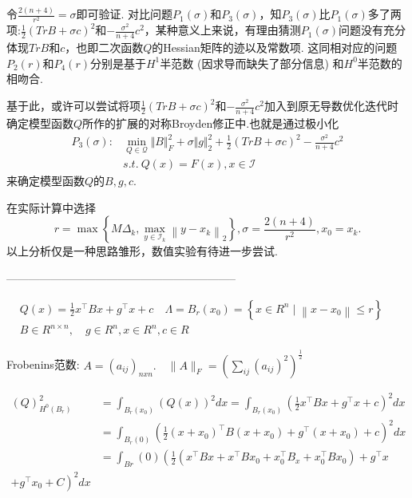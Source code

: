 \documentclass[UTF8]{ctexart}
\begin{document}
%
令$\frac{2(n+4)}{r^2}=\sigma$即可验证. 对比问题$P_1(\sigma)$和$P_3(\sigma)$，知$P_3(\sigma)$比$P_1(\sigma)$多了两项:$\frac{1}{2}(TrB+\sigma c)^{2}$和$-\frac{\sigma^2}{n+4}c^2$，某种意义上来说，有理由猜测$P_1(\sigma)$问题没有充分体现$TrB$和$c$，也即二次函数$Q$的Hessian矩阵的迹以及常数项. 这同相对应的问题$P_2(r)$和$P_4(r)$分别是基于$H^1$半范数 (因求导而缺失了部分信息) 和$H^0$半范数的相吻合.

基于此，或许可以尝试将项$\frac{1}{2}(TrB+\sigma c)^{2}$和$-\frac{\sigma^2}{n+4}c^2$加入到原无导数优化迭代时确定模型函数$Q$所作的扩展的对称Broyden修正中.也就是通过极小化
\begin{align*}
P_{3}(\sigma):&\mathop{\min}\limits_{Q\in\mathcal{Q}}\Vert B\Vert^{2}_{F}+\sigma\Vert g\Vert^{2}_{2}+\frac{1}{2}(TrB+\sigma c)^{2}-\frac{\sigma^2}{n+4}c^2\\
&s.t. \  Q(x)=F(x), x\in \mathcal{I}
\end{align*}
来确定模型函数$Q$的$B,g,c$.

在实际计算中选择
$$
r=\max \left\{M \Delta_{k}, \max _{y \in \mathcal{I}_{k}}\left\|y-x_{k}\right\|_{2}\right\}, 
\sigma=\frac{2(n+4)}{r^2}, x_0=x_k.
$$
以上分析仅是一种思路雏形，数值实验有待进一步尝试.

--------------------------------------------------------------


\(
\begin{aligned}
&Q(x)=\frac{1}{2} x^{\top} B x+g^{\top} x+c \quad \Lambda=B_{r}\left(x_{0}\right)=\left\{x \in R^{n} \mid\left\|x-x_{0}\right\| \leq r\right\}\\
&B \in R^{n \times n}, \quad g \in R^{n}, x \in R^{n}, c \in R
\end{aligned}
\)

Frobenins范数:
\(
A=\left(a_{i j}\right)_{n x n} . \quad\|A\|_{F}=\left(\sum_{i j}\left(a_{i j}\right)^{2}\right)^{\frac{1}{2}}
\)

\(
\begin{aligned}
(Q)_{H^{0}\left(B_{r}\right)}^{2} &=\int_{B_{r}\left(x_{0}\right)}(Q(x))^{2} d x=\int_{B_{r}\left(x_{0}\right)}\left(\frac{1}{2} x^{\top} B x+g^{\top} x+c\right)^{2} d x \\
&=\int_{B_{r}(0)}\left(\frac{1}{2}\left(x+x_{0}\right)^{\top} B\left(x+x_{0}\right)+g^{\top}\left(x+x_{0}\right)+c\right)^{2} d x \\
&=\int_{B r}(0)\left(\frac{1}{2}\left(x^{\top} B x+x^{\top} B x_{0}+x_{0}^{\top} B_{x}+x_{0}^{\top} B x_{0}\right)+g^{\top} x\right.\\
\left.+g^{\top} x_{0}+C\right)^{2} d x
\end{aligned}
\)
\end{document}
